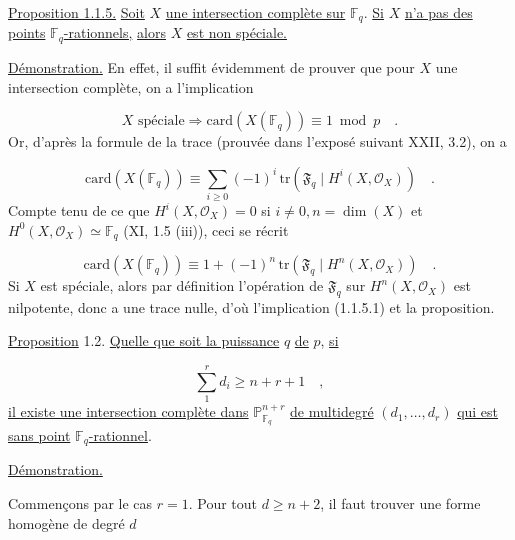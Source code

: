 \underline{Proposition 1.1.5.} \underline{Soit} $X$ \underline{une intersection complète sur} $\mathbb{F}_q$. \underline{Si} $X$ \underline{n'a pas des points} $\mathbb{F}_q$\underline{-rationnels,} \underline{alors} $X$ \underline{est non spéciale.}



\underline{Démonstration.} En effet, il suffit évidemment de prouver que pour $X$ une intersection complète, on a l'implication

\begin{equation}\tag{1.1.5.1}
X \text{ spéciale} \Longrightarrow \mathrm{card}(X(\mathbb{F}_q)) \equiv 1 \bmod p \quad .
\end{equation}
Or, d'après la formule de la trace (prouvée dans l'exposé suivant XXII, 3.2), on a

\begin{equation*}
\mathrm{card}(X(\mathbb{F}_q)) \equiv \sum_{i \geq 0} (-1)^i \, \mathrm{tr}(\mathfrak{F}_q \mid H^i(X,\mathcal{O}_X)) \quad .
\end{equation*}
Compte tenu de ce que $H^i(X,\mathcal{O}_X)=0$ si $i \neq 0, n=\dim(X)$ et $H^0(X,\mathcal{O}_X) \simeq \mathbb{F}_q$ (XI, 1.5 (iii)), ceci se récrit

\begin{equation*}
\mathrm{card}(X(\mathbb{F}_q)) \equiv 1 + (-1)^n \, \mathrm{tr}(\mathfrak{F}_q \mid H^n(X,\mathcal{O}_X)) \quad .
\end{equation*}
Si $X$ est spéciale, alors par définition l'opération de $\mathfrak{F}_q$ sur $H^n(X,\mathcal{O}_X)$ est nilpotente, donc a une trace nulle, d'où l'implication (1.1.5.1) et la proposition.

\underline{Proposition} 1.2. \underline{Quelle que soit la puissance} $q$ \underline{de} $p$, \underline{si}

\begin{equation*}
\sum_1^r d_i \geq n+r+1 \quad ,
\end{equation*}
\underline{il existe une intersection complète dans} $\mathbb{P}^{n+r}_{\mathbb{F}_q}$ \underline{de multidegré} $(d_1,\dots,d_r)$ \underline{qui est sans point} $\mathbb{F}_q$\underline{-rationnel}.

\underline{Démonstration.}

Commençons par le cas $r=1$. Pour tout $d \geq n+2$, il faut trouver une forme homogène de degré $d$ 



